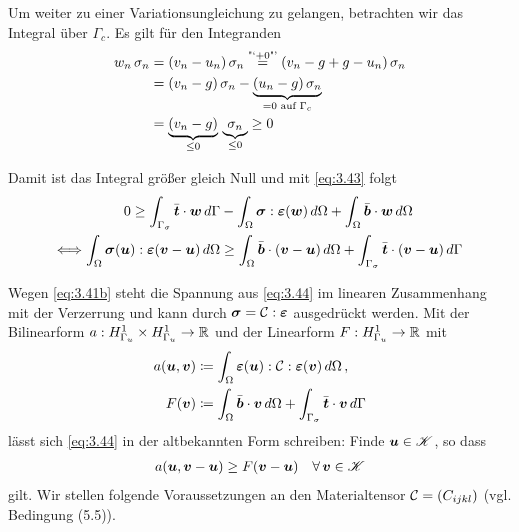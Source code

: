Um weiter zu einer Variationsungleichung zu gelangen, betrachten wir das Integral über $\Gamma_c$. Es gilt für den Integranden
\begin{align*}
	w_n \, \sigma_n &= (v_n - u_n) \, \sigma_n \stackrel{\scriptsize\text{"`}+0\text{"'}}= (v_n-g+g-u_n) \, \sigma_n  \\
	& =(v_n - g) \, \sigma_n - \underbrace{(u_n-g) \, \sigma_n}_{=0 \text{ auf } \Gamma_c} \\
	&  =\underbrace{ (v_n-g)}_{\le 0} \, \underbrace{\sigma_n}_{\le 0} \ge 0
\end{align*}


Damit ist das Integral größer gleich Null und mit \eqref{eq:3.43} folgt
\begin{align}\notag
	 0 \ge \int_{\Gamma_\sigma} \bar{\boldsymbol t} \cdot \boldsymbol w \, d\Gamma &-\int_\Omega \boldsymbol\sigma: \boldsymbol {\varepsilon}(\boldsymbol w) \, d\Omega + \int_\Omega \bar{\boldsymbol b} \cdot \boldsymbol w \, d\Omega \\
	\label{eq:3.44}
	\Longleftrightarrow \int_\Omega \boldsymbol\sigma(\boldsymbol u): \boldsymbol {\varepsilon}(\boldsymbol v - \boldsymbol u) \, d\Omega & \ge\int_\Omega \bar{\boldsymbol b} \cdot (\boldsymbol v-\boldsymbol u) \, d\Omega+ \int_{\Gamma_\sigma} \bar{\boldsymbol t} \cdot (\boldsymbol v-\boldsymbol u) \, d\Gamma 
\end{align}

Wegen \eqref{eq:3.41b} steht die Spannung aus \eqref{eq:3.44} im linearen Zusammenhang mit der Verzerrung und kann durch $\boldsymbol\sigma = \mathcal C : \boldsymbol{\varepsilon}$ ausgedrückt werden. Mit der Bilinearform $a: H^1_{\Gamma_u} \times H^1_{\Gamma_u} \rightarrow \mathbb{R}$ und der Linearform $F: H^1_{\Gamma_u} \rightarrow \mathbb{R}$ mit
\begin{subequations}
\begin{align}\label{eq:3.44a}
	a(\boldsymbol u,\boldsymbol v) &\coloneqq \int_\Omega \boldsymbol{\varepsilon} (\boldsymbol u) : \mathcal C : \boldsymbol{\varepsilon}(\boldsymbol v) \, d\Omega \, ,\\ 
	\label{eq:3.44b}
	 F(\boldsymbol v)& \coloneqq \int_\Omega \bar{\boldsymbol b} \cdot \boldsymbol v \, d\Omega + \int_{\Gamma_\sigma} \bar{\boldsymbol t} \cdot \boldsymbol v \, d\Gamma 
\end{align}
\end{subequations}
lässt sich \eqref{eq:3.44} in der altbekannten Form schreiben: Finde $\boldsymbol u \in \mathscr K$, so dass
\begin{align}\label{eq:3.45}
	a(\boldsymbol u, \boldsymbol v - \boldsymbol u) \ge F(\boldsymbol v- \boldsymbol u) \quad \forall \, \boldsymbol v \in \mathscr K 
\end{align}
gilt. Wir stellen folgende Voraussetzungen an den Materialtensor $\mathcal C = (C_{ijkl})$ (vgl. \cite{KikOden} Bedingung (5.5)).



